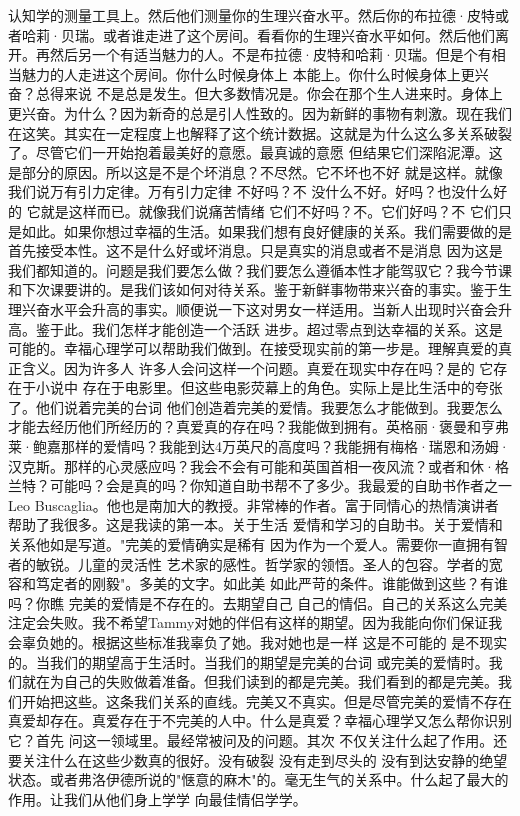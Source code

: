 认知学的测量工具上。然后他们测量你的生理兴奋水平。然后你的布拉德·皮特或者哈莉·贝瑞。或者谁走进了这个房间。看看你的生理兴奋水平如何。然后他们离开。再然后另一个有适当魅力的人。不是布拉德·皮特和哈莉·贝瑞。但是个有相当魅力的人走进这个房间。你什么时候身体上 本能上。你什么时候身体上更兴奋？总得来说 不是总是发生。但大多数情况是。你会在那个生人进来时。身体上更兴奋。为什么？因为新奇的总是引人性致的。因为新鲜的事物有刺激。现在我们在这笑。其实在一定程度上也解释了这个统计数据。这就是为什么这么多关系破裂了。尽管它们一开始抱着最美好的意愿。最真诚的意愿 但结果它们深陷泥潭。这是部分的原因。所以这是不是个坏消息？不尽然。它不坏也不好 就是这样。就像我们说万有引力定律。万有引力定律 不好吗？不 没什么不好。好吗？也没什么好的 它就是这样而已。就像我们说痛苦情绪 它们不好吗？不。它们好吗？不 它们只是如此。如果你想过幸福的生活。如果我们想有良好健康的关系。我们需要做的是首先接受本性。这不是什么好或坏消息。只是真实的消息或者不是消息 因为这是我们都知道的。问题是我们要怎么做？我们要怎么遵循本性才能驾驭它？我今节课和下次课要讲的。是我们该如何对待关系。鉴于新鲜事物带来兴奋的事实。鉴于生理兴奋水平会升高的事实。顺便说一下这对男女一样适用。当新人出现时兴奋会升高。鉴于此。我们怎样才能创造一个活跃 进步。超过零点到达幸福的关系。这是可能的。幸福心理学可以帮助我们做到。在接受现实前的第一步是。理解真爱的真正含义。因为许多人 许多人会问这样一个问题。真爱在现实中存在吗？是的 它存在于小说中 存在于电影里。但这些电影荧幕上的角色。实际上是比生活中的夸张了。他们说着完美的台词 他们创造着完美的爱情。我要怎么才能做到。我要怎么才能去经历他们所经历的？真爱真的存在吗？我能做到拥有。英格丽·褒曼和亨弗莱·鲍嘉那样的爱情吗？我能到达4万英尺的高度吗？我能拥有梅格·瑞恩和汤姆·汉克斯。那样的心灵感应吗？我会不会有可能和英国首相一夜风流？或者和休·格兰特？可能吗？会是真的吗？你知道自助书帮不了多少。我最爱的自助书作者之一 Leo Buscaglia。他也是南加大的教授。非常棒的作者。富于同情心的热情演讲者 帮助了我很多。这是我读的第一本。关于生活 爱情和学习的自助书。关于爱情和关系他如是写道。"完美的爱情确实是稀有 因为作为一个爱人。需要你一直拥有智者的敏锐。儿童的灵活性 艺术家的感性。哲学家的领悟。圣人的包容。学者的宽容和笃定者的刚毅"。多美的文字。如此美 如此严苛的条件。谁能做到这些？有谁吗？你瞧 完美的爱情是不存在的。去期望自己 自己的情侣。自己的关系这么完美 注定会失败。我不希望Tammy对她的伴侣有这样的期望。因为我能向你们保证我会辜负她的。根据这些标准我辜负了她。我对她也是一样 这是不可能的 是不现实的。当我们的期望高于生活时。当我们的期望是完美的台词 或完美的爱情时。我们就在为自己的失败做着准备。但我们读到的都是完美。我们看到的都是完美。我们开始把这些。这条我们关系的直线。完美又不真实。但是尽管完美的爱情不存在 真爱却存在。真爱存在于不完美的人中。什么是真爱？幸福心理学又怎么帮你识别它？首先 问这一领域里。最经常被问及的问题。其次 不仅关注什么起了作用。还要关注什么在这些少数真的很好。没有破裂 没有走到尽头的 没有到达安静的绝望状态。或者弗洛伊德所说的"惬意的麻木"的。毫无生气的关系中。什么起了最大的作用。让我们从他们身上学学 向最佳情侣学学。 
